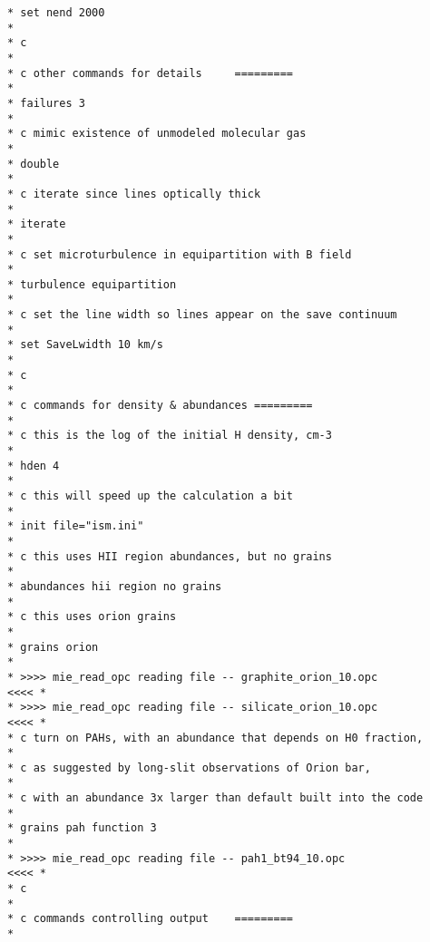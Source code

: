 {\begin{verbatim}
* set nend 2000                                                                   *
* c                                                                               *
* c other commands for details     =========                                      *
* failures 3                                                                      *
* c mimic existence of unmodeled molecular gas                                    *
* double                                                                          *
* c iterate since lines optically thick                                           *
* iterate                                                                         *
* c set microturbulence in equipartition with B field                             *
* turbulence equipartition                                                        *
* c set the line width so lines appear on the save continuum                     *
* set SaveLwidth 10 km/s                                                         *
* c                                                                               *
* c commands for density & abundances =========                                   *
* c this is the log of the initial H density, cm-3                                *
* hden 4                                                                          *
* c this will speed up the calculation a bit                                      *
* init file="ism.ini"                                                             *
* c this uses HII region abundances, but no grains                                *
* abundances hii region no grains                                                 *
* c this uses orion grains                                                        *
* grains orion                                                                    *
* >>>> mie_read_opc reading file -- graphite_orion_10.opc                    <<<< *
* >>>> mie_read_opc reading file -- silicate_orion_10.opc                    <<<< *
* c turn on PAHs, with an abundance that depends on H0 fraction,                  *
* c as suggested by long-slit observations of Orion bar,                          *
* c with an abundance 3x larger than default built into the code                  *
* grains pah function 3                                                           *
* >>>> mie_read_opc reading file -- pah1_bt94_10.opc                         <<<< *
* c                                                                               *
* c commands controlling output    =========                                      *

\end{verbatim}}
